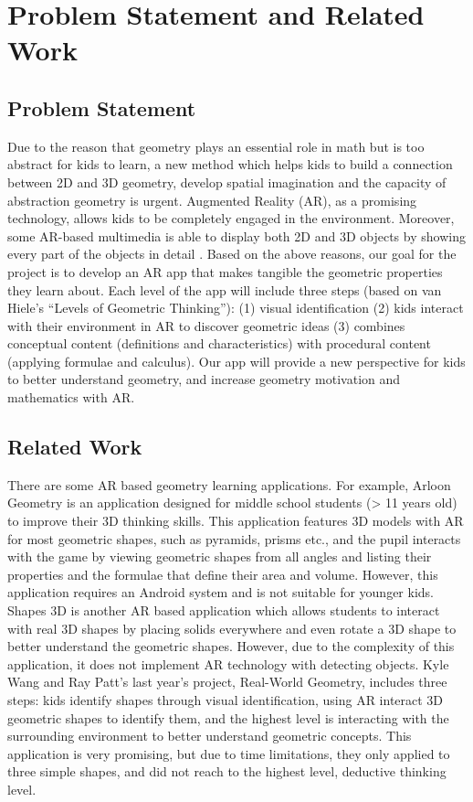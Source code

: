 \documentclass[acmsmall, nonacm]{acmart}
\begin{document}
\section{Problem Statement and Related Work}

\subsection{Problem Statement}

Due to the reason that geometry plays an essential role in math but is too
abstract for kids to learn, a new method which helps kids to build a connection
between 2D and 3D geometry, develop spatial imagination and the capacity of
abstraction geometry is urgent. Augmented Reality (AR), as a promising
technology, allows kids to be completely engaged in the environment. Moreover,
some AR-based multimedia is able to display both 2D and 3D objects by showing
every part of the objects in detail \cite{use-of-geometry-media}.  Based on the
above reasons, our goal for the project is to develop an AR app that makes
tangible the geometric properties they learn about. Each level of the app will
include three steps (based on van Hiele’s “Levels of Geometric Thinking”): (1)
visual identification (2) kids interact with their environment in AR to discover
geometric ideas (3) combines conceptual content (definitions and
characteristics) with procedural content (applying formulae and calculus). Our
app will provide a new perspective for kids to better understand geometry, and
increase geometry motivation and mathematics with AR.

\subsection{Related Work}

There are some AR based geometry learning applications. For example, Arloon
Geometry is an application designed for middle school students (> 11 years old)
to improve their 3D thinking skills. This application features 3D models with AR
for most geometric shapes, such as pyramids, prisms etc., and the pupil
interacts with the game by viewing geometric shapes from all angles and listing
their properties and the formulae that define their area and volume. However,
this application requires an Android system and is not suitable for younger
kids. Shapes 3D is another AR based application which allows students to
interact with real 3D shapes by placing solids everywhere and even rotate a 3D
shape to better understand the geometric shapes. However, due to the complexity
of this application, it does not implement AR technology with detecting
objects. Kyle Wang and Ray Patt’s last year’s project, Real-World Geometry,
includes three steps: kids identify shapes through visual identification, using
AR interact 3D geometric shapes to identify them, and the highest level is
interacting with the surrounding environment to better understand geometric
concepts. This application is very promising, but due to time limitations, they
only applied to three simple shapes, and did not reach to the highest level,
deductive thinking level.
\end{document}
